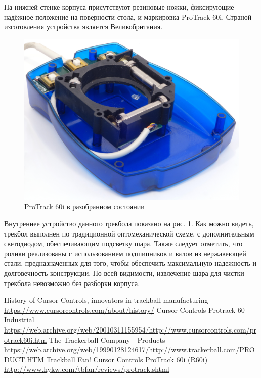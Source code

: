 \documentclass[11pt, a4paper]{article}
\begin{document}
На нижней стенке корпуса присутствуют резиновые ножки, фиксирующие надёжное положение на поверности стола, и маркировка ProTrack 60i. Страной изготовления устройства является Великобритания.

\begin{figure}[h]
    \centering
    \includegraphics[scale=0.6]{1999_protrack_60i/razobr3_60.jpg}
    \caption{ProTrack 60i в разобранном состоянии}
    \label{fig:ProTrack60iInside}
\end{figure}

 Внутреннее устройство данного трекбола показано на рис. \ref{fig:ProTrack60iInside}. Как можно видеть,  трекбол выполнен по традиционной оптомеханической схеме, с дополнительным светодиодом, обеспечивающим подсветку шара. Также следует отметить, что ролики реализованы с использованием подшипников и валов из нержавеющей стали, предназначенных для того, чтобы обеспечить максимальную надежность и долговечность конструкции.
По всей видимости, извлечение шара для чистки трекбола невозможно без разборки корпуса.

\begin{thebibliography}{9}
 History of Cursor Controls, innovators in trackball manufacturing \url{https://www.cursorcontrols.com/about/history/}
 Cursor Controls Protrack 60 Industrial \url{https://web.archive.org/web/20010311155954/http://www.cursorcontrols.com/protrack60i.htm}
 The Trackerball Company - Products \url{https://web.archive.org/web/19990128124617/http://www.trackerball.com/PRODUCT.HTM}
 Trackball Fan! Cursor Controls ProTrack 60i (R60i) \url{http://www.hykw.com/tbfan/reviews/protrack.shtml}
\end{thebibliography}
\end{document}
